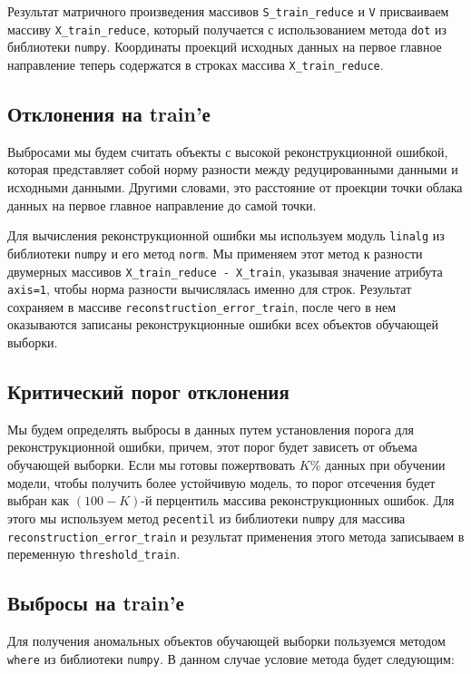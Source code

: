 \documentclass[a4paper,12pt]{article}
\begin{document}
Результат матричного произведения массивов \texttt{S\_train\_reduce} и \texttt{V} присваиваем массиву \texttt{X\_train\_reduce}, который получается с использованием метода \texttt{dot} из библиотеки \texttt{numpy}. Координаты проекций исходных данных на первое главное направление теперь содержатся в строках массива \texttt{X\_train\_reduce}.

\subsection{Отклонения на  train'е}


Выбросами мы будем считать объекты с высокой реконструкционной ошибкой, которая представляет собой норму разности между редуцированными данными и исходными данными. Другими словами, это расстояние от проекции точки облака данных на первое главное направление до самой точки.

Для вычисления реконструкционной ошибки мы используем модуль \texttt{linalg} из библиотеки \texttt{numpy} и его метод \texttt{norm}. Мы применяем этот метод к разности двумерных массивов \texttt{X\_train\_reduce - X\_train}, указывая значение атрибута \texttt{axis=1}, чтобы норма разности вычислялась именно для строк. Результат сохраняем в массиве \texttt{reconstruction\_error\_train}, после чего в нем оказываются записаны  реконструкционные ошибки всех объектов обучающей выборки.

\subsection{Критический порог отклонения}


Мы будем определять выбросы в данных путем установления порога для реконструкционной ошибки, причем, этот порог будет зависеть от объема обучающей выборки. Если мы готовы пожертвовать $K$\% данных при обучении модели, чтобы получить более устойчивую модель, то порог отсечения будет выбран как $(100 - K)$-й перцентиль массива реконструкционных ошибок. Для этого мы используем метод \texttt{pecentil} из библиотеки \texttt{numpy} для массива \texttt{reconstruction\_error\_train} и результат применения этого метода записываем в переменную \texttt{threshold\_train}.

\subsection{Выбросы на train'е}


Для получения аномальных объектов обучающей выборки пользуемся методом \texttt{where} из библиотеки \texttt{numpy}. В данном случае условие метода будет следующим: 
\end{document}
